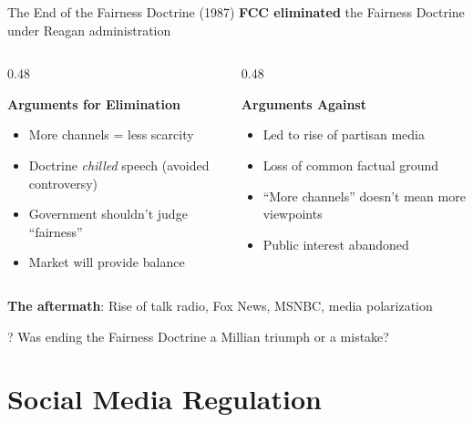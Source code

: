 ﻿\documentclass[aspectratio=169]{beamer}
\begin{document}
\begin{frame}{The End of the Fairness Doctrine (1987)}
\textbf{FCC eliminated} the Fairness Doctrine under Reagan administration

\vspace{0.2cm}
\begin{columns}[T]
\begin{column}{0.48\textwidth}
\begin{block}{\textbf{Arguments for Elimination}}
\begin{itemize}
    \item More channels = less scarcity
    \item Doctrine \textit{chilled} speech (avoided controversy)
    \item Government shouldn't judge ``fairness''
    \item Market will provide balance
\end{itemize}
\end{block}
\end{column}

\begin{column}{0.48\textwidth}
\begin{block}{\textbf{Arguments Against}}
\begin{itemize}
    \item Led to rise of partisan media
    \item Loss of common factual ground
    \item ``More channels'' doesn't mean more viewpoints
    \item Public interest abandoned
\end{itemize}
\end{block}
\end{column}
\end{columns}

\vspace{0.3cm}
\textbf{The aftermath}: Rise of talk radio, Fox News, MSNBC, media polarization

\begin{alertblock}{?}
Was ending the Fairness Doctrine a Millian triumph or a mistake?
\end{alertblock}
\end{frame}


\section{Social Media Regulation}
\end{document}
